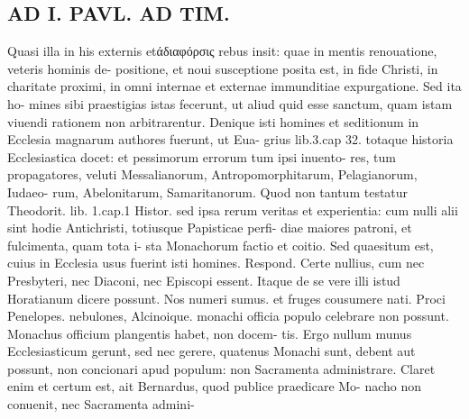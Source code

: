 \documentclass{article}
\begin{document}
\begin{pages}
\section*{AD I. PAVL. AD TIM. }
\marginpar{[ p.222 ]}Quasi illa in his externis etάδιαφόρσις rebus insit: quae in mentis renouatione, veteris hominis de- positione, et noui susceptione posita est, in fide Christi, in charitate proximi, in omni internae et externae immunditiae expurgatione. Sed ita ho- mines sibi praestigias istas fecerunt, ut aliud quid esse sanctum, quam istam viuendi rationem non arbitrarentur. Denique isti homines et seditionum in Ecclesia magnarum authores fuerunt, ut Eua- grius lib.3.cap 32. totaque historia Ecclesiastica docet: et pessimorum errorum tum ipsi inuento- res, tum propagatores, veluti Messalianorum, Antropomorphitarum, Pelagianorum, Iudaeo- rum, Abelonitarum, Samaritanorum. Quod non tantum testatur Theodorit. lib. 1.cap.1 Histor. sed ipsa rerum veritas et experientia: cum nulli alii sint hodie Antichristi, totiusque Papisticae perfi- diae maiores patroni, et fulcimenta, quam tota i- sta Monachorum factio et coitio. Sed quaesitum est, cuius in Ecclesia usus fuerint isti homines. Respond. Certe nullius, cum nec Presbyteri, nec Diaconi, nec Episcopi essent. Itaque de se vere illi istud Horatianum dicere possunt. Nos numeri sumus. et fruges cousumere nati. Proci Penelopes. nebulones, Alcinoique. monachi officia populo celebrare non possunt. Monachus officium plangentis habet, non docem- tis. Ergo nullum munus Ecclesiasticum gerunt, sed nec gerere, quatenus Monachi sunt, debent aut possunt, non concionari apud populum: non Sacramenta administrare. Claret enim et certum est, ait Bernardus, quod publice praedicare Mo- nacho non conuenit, nec Sacramenta admini- 

\end{pages}
\end{document}
